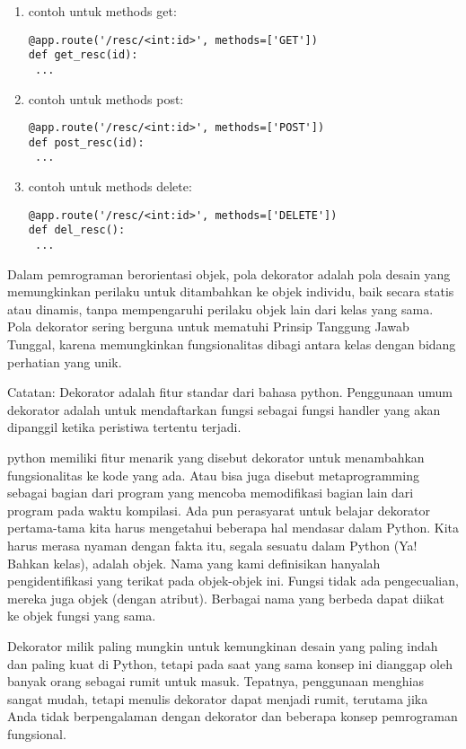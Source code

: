 \documentclass[12pt,a4paper]{article}
\begin{document}
\begin{enumerate}
\item contoh untuk methods get:
\begin{verbatim} 
@app.route('/resc/<int:id>', methods=['GET'])
def get_resc(id):
 ...
\end{verbatim}

\item contoh untuk methods post:
\begin{verbatim} 
@app.route('/resc/<int:id>', methods=['POST'])
def post_resc(id):
 ...
\end{verbatim}

\item contoh untuk methods delete:
\begin{verbatim} 
@app.route('/resc/<int:id>', methods=['DELETE'])
def del_resc():
 ...
\end{verbatim}
\end{enumerate}
Dalam pemrograman berorientasi objek, pola dekorator adalah pola desain yang memungkinkan perilaku untuk ditambahkan ke objek individu, baik secara statis atau dinamis, tanpa mempengaruhi perilaku objek lain dari kelas yang sama. Pola dekorator sering berguna untuk mematuhi Prinsip Tanggung Jawab Tunggal, karena memungkinkan fungsionalitas dibagi antara kelas dengan bidang perhatian yang unik.

Catatan:
Dekorator adalah fitur standar dari bahasa python. Penggunaan umum dekorator adalah untuk mendaftarkan fungsi sebagai fungsi handler yang akan dipanggil ketika peristiwa tertentu terjadi.

python memiliki fitur menarik yang disebut dekorator untuk menambahkan fungsionalitas ke kode yang ada. Atau bisa juga disebut metaprogramming sebagai bagian dari program yang mencoba memodifikasi bagian lain dari program pada waktu kompilasi. Ada pun perasyarat untuk belajar dekorator pertama-tama kita harus mengetahui beberapa hal mendasar dalam Python. Kita harus merasa nyaman dengan fakta itu, segala sesuatu dalam Python (Ya! Bahkan kelas), adalah objek. Nama yang kami definisikan hanyalah pengidentifikasi yang terikat pada objek-objek ini. Fungsi tidak ada pengecualian, mereka juga objek (dengan atribut). Berbagai nama yang berbeda dapat diikat ke objek fungsi yang sama.

Dekorator milik paling mungkin untuk kemungkinan desain yang paling indah dan paling kuat di Python, tetapi pada saat yang sama konsep ini dianggap oleh banyak orang sebagai rumit untuk masuk. Tepatnya, penggunaan menghias sangat mudah, tetapi menulis dekorator dapat menjadi rumit, terutama jika Anda tidak berpengalaman dengan dekorator dan beberapa konsep pemrograman fungsional. 
\end{document}
